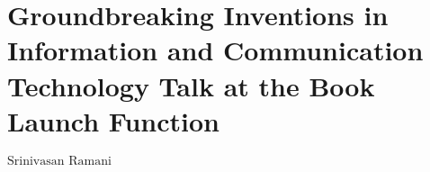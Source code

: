 \chapter{Groundbreaking Inventions in Information and Communication Technology Talk at the Book Launch Function}



\vskip 0.8cm

\begin{center}
{\large\uppercase{$\text{Srinivasan Ramani}$}} 


\vskip -6pt

\end{center}

\vskip 2cm




\vfill




\newpage

